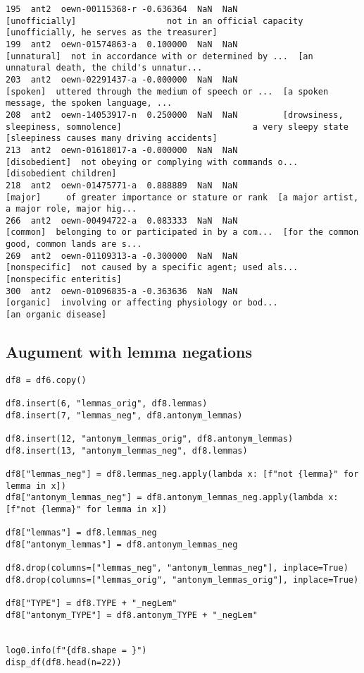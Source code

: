 \documentclass[a4paper,10pt,onecolumn,oneside,openright]{article}
\begin{document}
\begin{verbatim}
195  ant2  oewn-00115368-r -0.636364  NaN  NaN                               [unofficially]                  not in an official capacity   [unofficially, he serves as the treasurer]
199  ant2  oewn-01574863-a  0.100000  NaN  NaN                                  [unnatural]  not in accordance with or determined by ...  [an unnatural death, the child's unnatur...
203  ant2  oewn-02291437-a -0.000000  NaN  NaN                                     [spoken]  uttered through the medium of speech or ...  [a spoken message, the spoken language, ...
208  ant2  oewn-14053917-n  0.250000  NaN  NaN         [drowsiness, sleepiness, somnolence]                          a very sleepy state   [sleepiness causes many driving accidents]
213  ant2  oewn-01618017-a -0.000000  NaN  NaN                                [disobedient]  not obeying or complying with commands o...                       [disobedient children]
218  ant2  oewn-01475771-a  0.888889  NaN  NaN                                      [major]     of greater importance or stature or rank  [a major artist, a major role, major hig...
266  ant2  oewn-00494722-a  0.083333  NaN  NaN                                     [common]  belonging to or participated in by a com...  [for the common good, common lands are s...
269  ant2  oewn-01109313-a -0.300000  NaN  NaN                                [nonspecific]  not caused by a specific agent; used als...                      [nonspecific enteritis]
300  ant2  oewn-01096835-a -0.363636  NaN  NaN                                    [organic]  involving or affecting physiology or bod...                         [an organic disease]
\end{verbatim}
\subsection{Augument with lemma negations}
\label{sec:orgc6767df}
\begin{verbatim}
df8 = df6.copy()

df8.insert(6, "lemmas_orig", df8.lemmas)
df8.insert(7, "lemmas_neg", df8.antonym_lemmas)

df8.insert(12, "antonym_lemmas_orig", df8.antonym_lemmas)
df8.insert(13, "antonym_lemmas_neg", df8.lemmas)

df8["lemmas_neg"] = df8.lemmas_neg.apply(lambda x: [f"not {lemma}" for lemma in x])
df8["antonym_lemmas_neg"] = df8.antonym_lemmas_neg.apply(lambda x: [f"not {lemma}" for lemma in x])

df8["lemmas"] = df8.lemmas_neg
df8["antonym_lemmas"] = df8.antonym_lemmas_neg

df8.drop(columns=["lemmas_neg", "antonym_lemmas_neg"], inplace=True)
df8.drop(columns=["lemmas_orig", "antonym_lemmas_orig"], inplace=True)

df8["TYPE"] = df8.TYPE + "_negLem"
df8["antonym_TYPE"] = df8.antonym_TYPE + "_negLem"


log0.info(f"{df8.shape = }")
disp_df(df8.head(n=22))
\end{verbatim}
\end{document}
